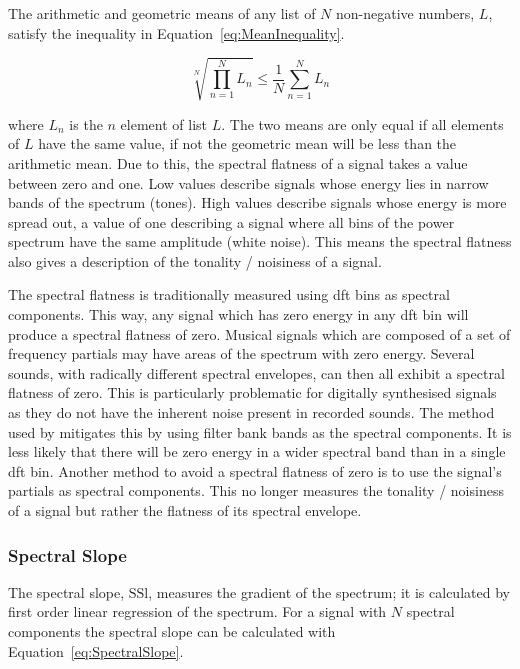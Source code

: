 			The arithmetic and geometric means of any list of $N$ non-negative numbers, $L$, satisfy the
			inequality in Equation~\ref{eq:MeanInequality}.

			\begin{equation}
				\sqrt[N]{\prod_{n = 1}^{N} L_{n}} \leq \frac{1}{N} \sum_{n = 1}^{N} L_{n}
				\label{eq:MeanInequality}
			\end{equation}

			where $L_{n}$ is the $n$ element of list $L$. The two means are only equal if all
			elements of $L$ have the same value, if not the geometric mean will be less than the arithmetic
			mean. Due to this, the spectral flatness of a signal takes a value between zero and one. Low values
			describe signals whose energy lies in narrow bands of the spectrum (tones). High values describe
			signals whose energy is more spread out, a value of one describing a signal where all bins of the
			power spectrum have the same amplitude (white noise). This means the spectral flatness also gives a
			description of the tonality / noisiness of a signal.

			The spectral flatness is traditionally measured using \acrshort{dft} bins as spectral components.
			This way, any signal which has zero energy in any \acrshort{dft} bin will produce a spectral
			flatness of zero. Musical signals which are composed of a set of frequency partials may have areas
			of the spectrum with zero energy. Several sounds, with radically different spectral envelopes, can
			then all exhibit a spectral flatness of zero. This is particularly problematic for digitally
			synthesised signals as they do not have the inherent noise present in recorded sounds.  The method
			used by \citet{peeters2004a} mitigates this by using filter bank bands as the spectral components.
			It is less likely that there will be zero energy in a wider spectral band than in a single
			\acrshort{dft} bin. Another method to avoid a spectral flatness of zero is to use the signal's
			partials as spectral components.  This no longer measures the tonality / noisiness of a signal but
			rather the flatness of its spectral envelope.

		\subsubsection*{Spectral Slope}
			The spectral slope, $\mathrm{SSl}$, measures the gradient of the spectrum; it is calculated by
			first order linear regression of the spectrum. For a signal with $N$ spectral components the
			spectral slope can be calculated with Equation~\ref{eq:SpectralSlope}.


